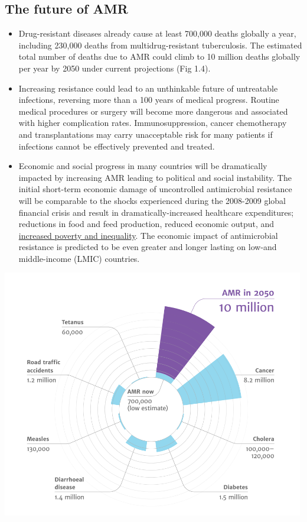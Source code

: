 \documentclass[]{tufte-handout}
\providecommand{\tightlist}{%
  \setlength{\itemsep}{0pt}\setlength{\parskip}{0pt}}
\begin{document}
\hypertarget{the-future-of-amr}{%
\subsection*{The future of AMR}\label{the-future-of-amr}}

\begin{itemize}
\tightlist
\item
  Drug-resistant diseases already cause at least 700,000 deaths globally
  a year, including 230,000 deaths from multidrug-resistant
  tuberculosis. The estimated total number of deaths due to AMR could
  climb to 10 million deaths globally per year by 2050 under current
  projections (Fig 1.4).
\item
  Increasing resistance could lead to an unthinkable future of
  untreatable infections, reversing more than a 100 years of medical
  progress. Routine medical procedures or surgery will become more
  dangerous and associated with higher complication rates.
  Immunosuppression, cancer chemotherapy and transplantations may carry
  unacceptable risk for many patients if infections cannot be
  effectively prevented and treated.
\item
  Economic and social progress in many countries will be dramatically
  impacted by increasing AMR leading to political and social
  instability. The initial short-term economic damage of uncontrolled
  antimicrobial resistance will be comparable to the shocks experienced
  during the 2008-2009 global financial crisis and result in
  dramatically-increased healthcare expenditures; reductions in food and
  feed production, reduced economic output, and
  \href{https://documents.worldbank.org/en/publication/documents-reports/documentdetail/323311493396993758/final-report}{increased
  poverty and inequality}. The economic impact of antimicrobial
  resistance is predicted to be even greater and longer lasting on
  low-and middle-income (LMIC) countries.
\end{itemize}

\includegraphics[width=5.20833in,height=\textheight]{images/AMR_deaths_2050.png}
\end{document}
